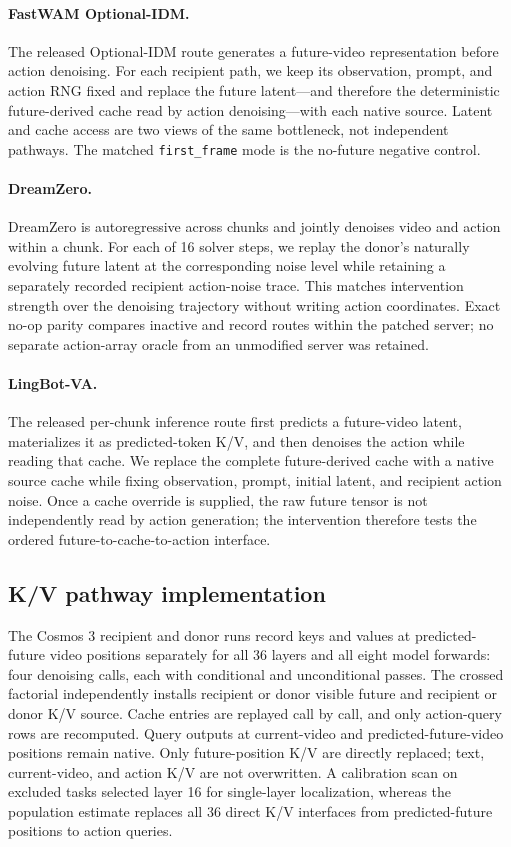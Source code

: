 \documentclass{article}
\begin{document}
\paragraph{FastWAM Optional-IDM.}
The released Optional-IDM route generates a future-video representation before action denoising. For each recipient path, we keep its observation, prompt, and action RNG fixed and replace the future latent---and therefore the deterministic future-derived cache read by action denoising---with each native source. Latent and cache access are two views of the same bottleneck, not independent pathways. The matched \texttt{first\_frame} mode is the no-future negative control.

\paragraph{DreamZero.}
DreamZero is autoregressive across chunks and jointly denoises video and action within a chunk. For each of 16 solver steps, we replay the donor's naturally evolving future latent at the corresponding noise level while retaining a separately recorded recipient action-noise trace. This matches intervention strength over the denoising trajectory without writing action coordinates. Exact no-op parity compares inactive and record routes within the patched server; no separate action-array oracle from an unmodified server was retained.

\paragraph{LingBot-VA.}
The released per-chunk inference route first predicts a future-video latent, materializes it as predicted-token K/V, and then denoises the action while reading that cache. We replace the complete future-derived cache with a native source cache while fixing observation, prompt, initial latent, and recipient action noise. Once a cache override is supplied, the raw future tensor is not independently read by action generation; the intervention therefore tests the ordered future-to-cache-to-action interface.

\subsection{K/V pathway implementation}
\label{app:pathway_impl}

The Cosmos 3 recipient and donor runs record keys and values at predicted-future video positions separately for all 36 layers and all eight model forwards: four denoising calls, each with conditional and unconditional passes. The crossed factorial independently installs recipient or donor visible future and recipient or donor K/V source. Cache entries are replayed call by call, and only action-query rows are recomputed. Query outputs at current-video and predicted-future-video positions remain native. Only future-position K/V are directly replaced; text, current-video, and action K/V are not overwritten. A calibration scan on excluded tasks selected layer 16 for single-layer localization, whereas the population estimate replaces all 36 direct K/V interfaces from predicted-future positions to action queries.
\end{document}
